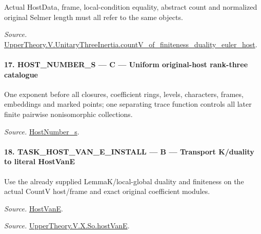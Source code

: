 Actual HostData, frame, local-condition equality, abstract count and normalized original Selmer length must all refer to the same objects.

\emph{Source.} \href{https://github.com/CocoSgt/riemann-hypothesis-lean/blob/7cbf7a0c32fca1badf05931879a37c3f8a2b03b4/src/Development/AutomorphicArithmetic/AutomorphicVarieties/ModularityArgument/ThresholdArguments/DenseThresholdCases/CountVOf.lean#L33-L60}{UpperTheory.V.UnitaryThreeInertia.countV\_\allowbreak of\_\allowbreak finiteness\_\allowbreak duality\_\allowbreak euler\_\allowbreak host}.



\paragraph{17. HOST\_\allowbreak NUMBER\_\allowbreak S — C — Uniform original-host rank-three catalogue}

One exponent before all closures, coefficient rings, levels, characters, frames, embeddings and marked points; one separating trace function controls all later finite pairwise nonisomorphic collections.

\emph{Source.} \href{https://github.com/CocoSgt/riemann-hypothesis-lean/blob/7cbf7a0c32fca1badf05931879a37c3f8a2b03b4/src/Development/AutomorphicArithmetic/AutomorphicVarieties/ModularityArgument/ThresholdArguments/DenseThresholdCases/HostNumberS.lean#L18-L28}{HostNumber\_\allowbreak s}.



\paragraph{18. TASK\_\allowbreak HOST\_\allowbreak VAN\_\allowbreak E\_\allowbreak INSTALL — B — Transport K/duality to literal HostVanE}

Use the already supplied LemmaK/local-global duality and finiteness on the actual CountV host/frame and exact original coefficient modules.

\emph{Source.} \href{https://github.com/CocoSgt/riemann-hypothesis-lean/blob/7cbf7a0c32fca1badf05931879a37c3f8a2b03b4/src/Development/AutomorphicArithmetic/AutomorphicVarieties/UnitaryThreeDeformations/HostNumber.lean#L9-L12}{HostVanE}.

\emph{Source.} \href{https://github.com/CocoSgt/riemann-hypothesis-lean/blob/7cbf7a0c32fca1badf05931879a37c3f8a2b03b4/src/Development/AutomorphicArithmetic/AutomorphicVarieties/LevelCohomology/SoHostVanE.lean#L11-L18}{UpperTheory.V.X.So.hostVanE}.



